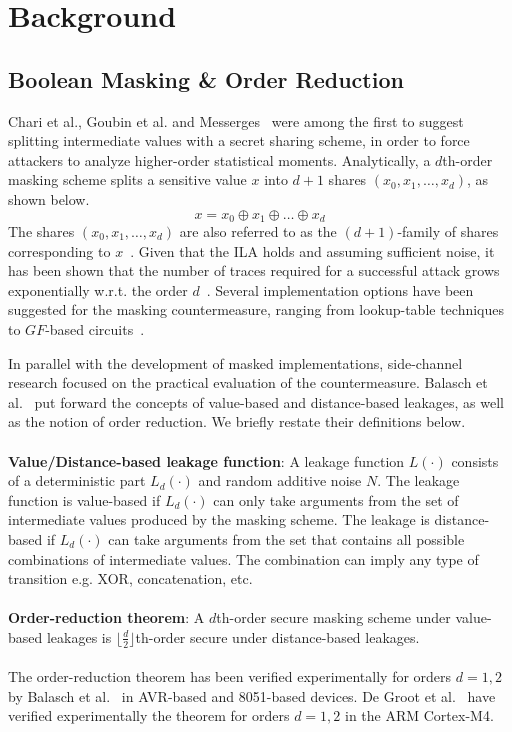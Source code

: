 \section{Background} \label{sec:background}
\subsection{Boolean Masking \& Order Reduction}
Chari et al., Goubin et al. and Messerges~\cite{DBLP:conf/crypto/ChariJRR99,DBLP:conf/ches/GoubinP99,DBLP:conf/fse/Messerges00} were among the first to suggest splitting intermediate
values with a secret sharing scheme, in order to force attackers to analyze higher-order statistical moments. Analytically, a $d$th-order masking scheme splits a sensitive value $x$ into $d+1$ shares $(x_0, x_1, \dots, x_d)$, as shown below.
\begin{equation}
x = x_0 \oplus  x_1 \oplus \dots \oplus x_d
\end{equation}
The shares $(x_0, x_1, \dots, x_d)$ are also referred to as the $(d+1)$-family of shares corresponding to $x$~\cite{DBLP:conf/ches/RivainP10}. Given that the ILA holds and assuming sufficient noise, it has been shown that the number of traces required for a successful attack grows exponentially w.r.t. the order $d$~\cite{DBLP:conf/crypto/ChariJRR99,DBLP:conf/eurocrypt/ProuffR13}. Several implementation options have been suggested for the masking countermeasure, ranging from lookup-table techniques~\cite{DBLP:conf/eurocrypt/Coron14,DBLP:conf/ctrsa/WangVGX15} to $GF$-based circuits~\cite{DBLP:conf/crypto/IshaiSW03,DBLP:conf/ches/RivainP10,cryptoeprint:2016:264}.

In parallel with the development of masked implementations, side-channel research focused on the practical evaluation of the countermeasure. Balasch et al.~\cite{DBLP:conf/cardis/BalaschGGRS14} put forward the concepts of value-based and distance-based leakages, as well as the notion of order reduction. We briefly restate their definitions below.\\\\
\textbf{Value/Distance-based leakage function}: A leakage function $L(\cdot)$ consists of a deterministic part $L_d(\cdot)$ and random additive noise $N$. The leakage function is value-based if $L_d(\cdot)$ can only take arguments from the set of intermediate values produced by the masking scheme. The leakage is distance-based if $L_d(\cdot)$ can  take arguments from the set that contains all possible combinations of intermediate values. The combination can imply any type of transition e.g. XOR, concatenation, etc.  \\\\
\textbf{Order-reduction theorem}: A $d$th-order secure masking scheme under value-based leakages is $\lfloor \frac{d}{2} \rfloor$th-order secure under distance-based leakages.\\\\
The order-reduction theorem has been verified experimentally for orders $d=1,2$ by Balasch et al.~\cite{DBLP:conf/cardis/BalaschGGRS14} in AVR-based and 8051-based devices. De Groot et al.~\cite{DBLP:journals/iacr/GrootPPSB16} have verified experimentally the theorem for orders $d=1,2$ in the ARM Cortex-M4.
